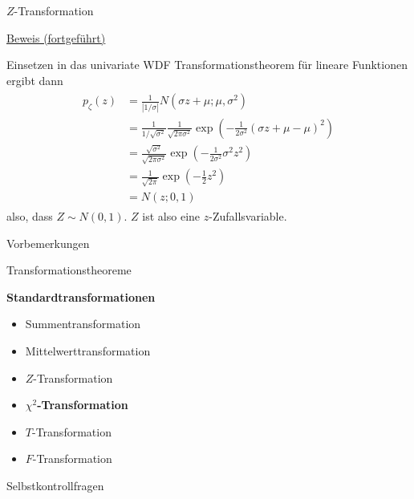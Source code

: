 \documentclass[
  8pt,
  ignorenonframetext,
]{beamer}
\providecommand{\tightlist}{%
  \setlength{\itemsep}{0pt}\setlength{\parskip}{0pt}}
\begin{document}
\begin{frame}{\(Z\)-Transformation}
\protect\hypertarget{z-transformation-5}{}
\footnotesize

\underline{Beweis (fortgeführt)} \vspace{2mm}

Einsetzen in das univariate WDF Transformationstheorem für lineare
Funktionen ergibt dann \begin{align}
\begin{split}
p_\zeta(z)
& = \frac{1}{|1/\sigma|}N\left(\sigma z + \mu; \mu , \sigma^2 \right) \\
& = \frac{1}{1/\sqrt{\sigma^2}}\frac{1}{\sqrt{2\pi\sigma^2}}\exp\left(-\frac{1}{2\sigma^2}\left(\sigma z + \mu - \mu\right)^2 \right) \\
& = \frac{\sqrt{\sigma^2}}{\sqrt{2\pi\sigma^2}}\exp\left(-\frac{1}{2\sigma^2}\sigma^2 z^2\right)\\
& = \frac{1}{\sqrt{2\pi}}\exp\left(-\frac{1}{2} z^2\right)\\
& = N(z;0,1)
\end{split}
\end{align} also, dass \(Z \sim N(0,1)\). \(Z\) ist also eine
\(z\)-Zufallsvariable.
\end{frame}

\begin{frame}{}
\protect\hypertarget{section-9}{}
\large

Vorbemerkungen

Transformationstheoreme

\textbf{Standardtransformationen}

\normalsize

\begin{itemize}
\tightlist
\item
  Summentransformation
\item
  Mittelwerttransformation
\item
  \(Z\)-Transformation
\item
  \textbf{\(\chi^2\)-Transformation}
\item
  \(T\)-Transformation
\item
  \(F\)-Transformation
\end{itemize}

\large

Selbstkontrollfragen
\end{frame}
\end{document}
